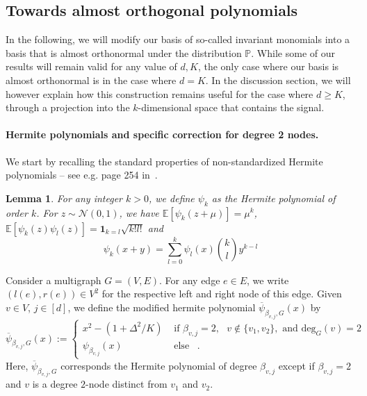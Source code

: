 \documentclass{article}
\newtheorem{lemma}{Lemma}
\begin{document}
\subsection{Towards almost orthogonal polynomials} 


In the following, we will modify our basis of so-called invariant monomials into a  basis that is almost orthonormal under the distribution $\mathbb{P}$. While some of our results will remain valid for any value of $d,K$, the only case where our basis is almost orthonormal is in the case where $d=K$. In the discussion section, we will however explain how this construction remains useful for the case where $d\geq K$, through a projection into the $k$-dimensional space that contains the signal. 


\paragraph{Hermite polynomials and specific correction for degree 2 nodes.} We start by recalling the standard properties of non-standardized Hermite polynomials -- see e.g. page 254 in~\cite{magnus2013formulas}.
\begin{lemma}\label{lem:hermite}
    For any integer $k>0$, we define $\psi_k$ as the Hermite polynomial of order $k$. 
    For $z\sim \mathcal{N}(0,1)$, we have $\mathbb{E}[\psi_k(z+\mu)]= \mu^k$, $\mathbb{E}[\psi_k(z)\psi_l(z)]= \mathbf{1}_{k=l}\sqrt{k!l!}$ and 
\begin{equation}\label{eq:recursion_hermite}
    \psi_k(x+y)= \sum_{l=0}^{k} \psi_l(x) \binom{k}{l}y^{k-l}
\end{equation}
\end{lemma}






Consider a multigraph $G=(V,E)$. For any edge $e\in E$, we write $(l(e),r(e))\in V^{2}$ for the respective left and right node of this edge. Given $v\in V$, $j\in [d]$, we define the modified hermite polynomial $\overline{\psi}_{{\beta_{v,j},G}}(x)$ by
\begin{equation}\label{eq:psi_bar}
\overline{\psi}_{{\beta_{v,j},G}}(x):= \left\{ \begin{array}{cc} 
    x^2 - (1+\Delta^2/K)  & \text{ if } \beta_{v,j}=2, \text{ }v\notin\{v_1,v_2\},\text{  and }\mathrm{deg}_G(v)=2\\
      \psi_{\beta_{v,j}}(x) & \text{ else }\enspace . 
\end{array}\right.
\end{equation}
Here, $\overline{\psi}_{{\beta_{v,j},G}}$ corresponds the Hermite polynomial of degree $\beta_{v,j}$ except if $\beta_{v,j}=2$ and $v$ is a degree $2$-node distinct from $v_1$ and $v_2$.
\end{document}
